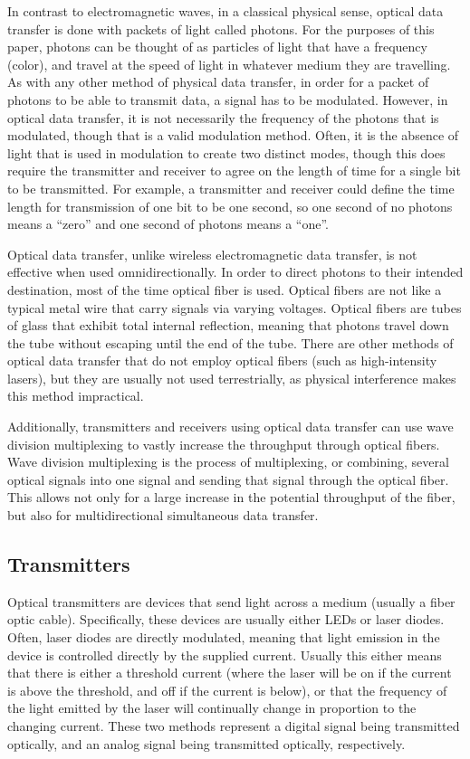 \documentclass[11pt]{article}
\begin{document}
In contrast to electromagnetic waves, in a classical physical sense, optical data transfer is done with packets of light called photons. For the purposes of this paper, photons can be thought of as particles of light that have a frequency (color), and travel at the speed of light in whatever medium they are travelling. As with any other method of physical data transfer, in order for a packet of photons to be able to transmit data, a signal has to be modulated. However, in optical data transfer, it is not necessarily the frequency of the photons that is modulated, though that is a valid modulation method. Often, it is the absence of light that is used in modulation to create two distinct modes, though this does require the transmitter and receiver to agree on the length of time for a single bit to be transmitted. For example, a transmitter and receiver could define the time length for transmission of one bit to be one second, so one second of no photons means a “zero” and one second of photons means a “one”. 

Optical data transfer, unlike wireless electromagnetic data transfer, is not effective when used omnidirectionally. In order to direct photons to their intended destination, most of the time optical fiber is used. Optical fibers are not like a typical metal wire that carry signals via varying voltages. Optical fibers are tubes of glass that exhibit total internal reflection, meaning that photons travel down the tube without escaping until the end of the tube. There are other methods of optical data transfer that do not employ optical fibers (such as high-intensity lasers), but they are usually not used terrestrially, as physical interference makes this method impractical. 

Additionally, transmitters and receivers using optical data transfer can use wave division multiplexing to vastly increase the throughput through optical fibers. Wave division multiplexing is the process of multiplexing, or combining, several optical signals into one signal and sending that signal through the optical fiber. This allows not only for a large increase in the potential throughput of the fiber, but also for multidirectional simultaneous data transfer. 

\subsection{Transmitters}

Optical transmitters are devices that send light across a medium (usually a fiber optic cable). Specifically, these devices are usually either LEDs or laser diodes. Often, laser diodes are directly modulated, meaning that light emission in the device is controlled directly by the supplied current. Usually this either means that there is either a threshold current (where the laser will be on if the current is above the threshold, and off if the current is below), or that the frequency of the light emitted by the laser will continually change in proportion to the changing current. These two methods represent a digital signal being transmitted optically, and an analog signal being transmitted optically, respectively. 
\end{document}
